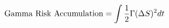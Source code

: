 \documentclass[preview]{standalone}
\begin{document}
\begin{align*}
\special{dvisvgm:raw <g id='unique000'>}\text{Gamma Risk Accumulation} = \int \frac{1}{2}\Gamma (\Delta S)^2 dt\special{dvisvgm:raw </g>}
\end{align*}
\end{document}
